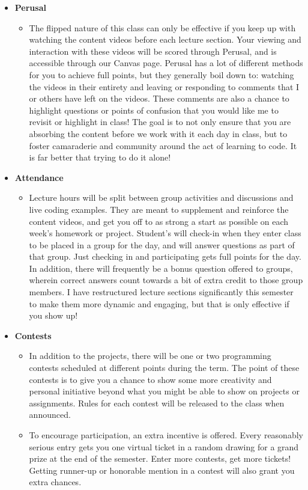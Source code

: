\documentclass[11pt]{article}
\begin{document}
\begin{itemize}
\begin{itemize}
	  \end{itemize}
	\item \textbf{Perusal}
		\begin{itemize}
			\item The flipped nature of this class can only be effective if you keep up with watching the content videos before each lecture section. Your viewing and interaction with these videos will be scored through Perusal, and is accessible through our Canvas page. Perusal has a lot of different methods for you to achieve full points, but they generally boil down to: watching the videos in their entirety and leaving or responding to comments that I or others have left on the videos. These comments are also a chance to highlight questions or points of confusion that you would like me to revisit or highlight in class! The goal is to not only ensure that you are absorbing the content before we work with it each day in class, but to foster camaraderie and community around the act of learning to code. It is far better that trying to do it alone!
		\end{itemize}
	\item \textbf{Attendance}
		\begin{itemize}
			\item Lecture hours will be split between group activities and discussions and live coding examples. They are meant to supplement and reinforce the content videos, and get you off to as strong a start as possible on each week's homework or project. Student's will check-in when they enter class to be placed in a group for the day, and will answer questions as part of that group. Just checking in and participating gets full points for the day. In addition, there will frequently be a bonus question offered to groups, wherein correct answers count towards a bit of extra credit to those group members. I have restructured lecture sections significantly this semester to make them more dynamic and engaging, but that is only effective if you show up!
		\end{itemize}

	\item \textbf{Contests}
		\begin{itemize}
			\item In addition to the projects, there will be one or two programming contests scheduled at different points during the term. The point of these contests is to give you a chance to show some more creativity and personal initiative beyond what you might be able to show on projects or assignments. Rules for each contest will be released to the class when announced.
			\item To encourage participation, an extra incentive is offered. Every reasonably serious entry gets you one virtual ticket in a random drawing for a grand prize at the end of the semester. Enter more contests, get more tickets! Getting runner-up or honorable mention in a contest will also grant you extra chances.
		\end{itemize}
		
\end{itemize}
\end{document}
